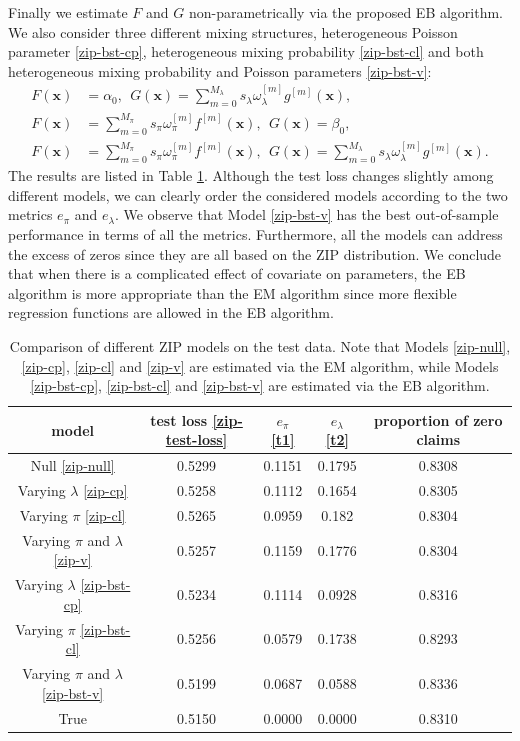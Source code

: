 \documentclass[11pt]{article}
\numberwithin{equation}{section}
\def\bx{\boldsymbol{x}}
\begin{document}
Finally we estimate $F$ and $G$ non-parametrically via the proposed EB algorithm. We also consider three different mixing structures, heterogeneous Poisson parameter  \eqref{zip-bst-cp}, heterogeneous mixing probability \eqref{zip-bst-cl} and both heterogeneous mixing probability and Poisson parameters \eqref{zip-bst-v}: 
\begin{align}
	F(\bx)&=\alpha_0, ~~G(\bx)=\sum_{m=0}^{M_\lambda} s_\lambda\omega_\lambda^{[m]} g^{[m]}(\bx), \label{zip-bst-cp} \\
	F(\bx)&=\sum_{m=0}^{M_\pi} s_\pi\omega_\pi^{[m]} f^{[m]}(\bx), ~~G(\bx)=\beta_0, \label{zip-bst-cl} \\
	F(\bx)&=\sum_{m=0}^{M_\pi} s_\pi\omega_\pi^{[m]} f^{[m]}(\bx),  ~~G(\bx)=\sum_{m=0}^{M_\lambda} s_\lambda\omega_\lambda^{[m]} g^{[m]}(\bx). \label{zip-bst-v}
\end{align}  
The results are listed in Table \ref{zip}.
Although the test loss changes slightly among different models, we can clearly order the considered models according to the two metrics $e_\pi$ and $e_\lambda$.
We observe that Model \eqref{zip-bst-v} has the best out-of-sample performance in terms of all the metrics.
Furthermore, all the models can address the excess of zeros since they are all based on the ZIP distribution.
We conclude that when there is a complicated effect of covariate on parameters, the EB algorithm is more appropriate than the EM algorithm since more flexible regression functions are allowed in the EB algorithm.   
\begin{table}[htp!]
	\caption{Comparison of different ZIP models on the test data. Note that Models \eqref{zip-null}, \eqref{zip-cp}, \eqref{zip-cl} and \eqref{zip-v} are estimated via the EM algorithm, while Models \eqref{zip-bst-cp}, \eqref{zip-bst-cl} and \eqref{zip-bst-v} are estimated via the EB algorithm.} \label{zip}
	\centering
	\begin{tabular}{ccccc}
		
		\hline
		model   & test loss \eqref{zip-test-loss}  & $e_\pi$ \eqref{t1}& $e_\lambda$ \eqref{t2} & proportion of zero claims \\ \hline
		Null \eqref{zip-null}    & 0.5299 & 0.1151     & 0.1795     & 0.8308        \\
		Varying $\lambda$ \eqref{zip-cp} & 0.5258 & 0.1112     & 0.1654     & 0.8305        \\
		Varying $\pi$ \eqref{zip-cl} & 0.5265 & 0.0959     & 0.182      & 0.8304        \\
		Varying $\pi$ and $\lambda$  \eqref{zip-v} & 0.5257 & 0.1159     & 0.1776     & 0.8304        \\
		Varying $\lambda$  \eqref{zip-bst-cp} & 0.5234 & 0.1114     & 0.0928     & 0.8316        \\
		Varying $\pi$   \eqref{zip-bst-cl} & 0.5256 & 0.0579     & 0.1738     & 0.8293        \\
		Varying $\pi$ and $\lambda$  \eqref{zip-bst-v}  & 0.5199 & 0.0687     & 0.0588     & 0.8336        \\
		True    & 0.5150  & 0.0000         & 0.0000         & 0.8310         \\ \hline
	\end{tabular}
\end{table}
\end{document}
